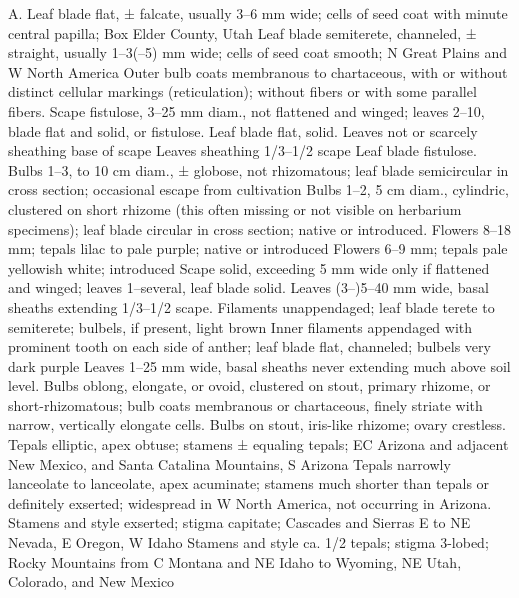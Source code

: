 \documentclass[a4paper]{article}
\begin{document}
\begin{Key}{A. }
\alter Leaf blade flat, ± falcate, usually 3--6 mm wide; cells of seed coat with minute central papilla; Box Elder County, Utah
\alter Leaf blade semiterete, channeled, ± straight, usually 1--3(--5) mm wide; cells of seed coat smooth; N Great Plains and W North America
\alter Outer bulb coats membranous to chartaceous, with or without distinct cellular markings (reticulation); without fibers or with some parallel fibers.
\alter Scape fistulose, 3--25 mm diam., not flattened and winged; leaves 2--10, blade flat and solid, or fistulose.
\alter Leaf blade flat, solid.
\alter Leaves not or scarcely sheathing base of scape
\alter Leaves sheathing 1/3--1/2 scape
\alter Leaf blade fistulose.
\alter Bulbs 1--3, to 10 cm diam., ± globose, not rhizomatous; leaf blade semicircular in cross section; occasional escape from cultivation
\alter Bulbs 1--2, 5 cm diam., cylindric, clustered on short rhizome (this often missing or not visible on herbarium specimens); leaf blade circular in cross section; native or introduced.
\alter Flowers 8--18 mm; tepals lilac to pale purple; native or introduced
\alter Flowers 6--9 mm; tepals pale yellowish white; introduced
\alter Scape solid, exceeding 5 mm wide only if flattened and winged; leaves 1--several, leaf blade solid.
\alter Leaves (3--)5--40 mm wide, basal sheaths extending 1/3--1/2 scape.
\alter Filaments unappendaged; leaf blade terete to semiterete; bulbels, if present, light brown
\alter Inner filaments appendaged with prominent tooth on each side of anther; leaf blade flat, channeled; bulbels very dark purple
\alter Leaves 1--25 mm wide, basal sheaths never extending much above soil level.
\alter Bulbs oblong, elongate, or ovoid, clustered on stout, primary rhizome, or short-rhizomatous; bulb coats membranous or chartaceous, finely striate with narrow, vertically elongate cells.
\alter Bulbs on stout, iris-like rhizome; ovary crestless.
\alter Tepals elliptic, apex obtuse; stamens ± equaling tepals; EC Arizona and adjacent New Mexico, and Santa Catalina Mountains, S Arizona
\alter Tepals narrowly lanceolate to lanceolate, apex acuminate; stamens much shorter than tepals or definitely exserted; widespread in W North America, not occurring in Arizona.
\alter Stamens and style exserted; stigma capitate; Cascades and Sierras E to NE Nevada, E Oregon, W Idaho
\alter Stamens and style ca. 1/2 tepals; stigma 3-lobed; Rocky Mountains from C Montana and NE Idaho to Wyoming, NE Utah, Colorado, and New Mexico

\end{Key}
\end{document}
